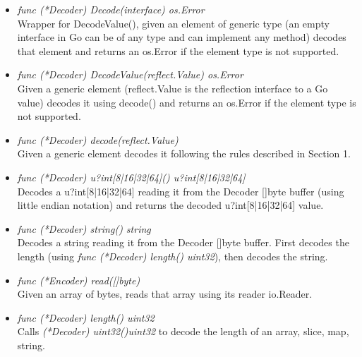 \begin{itemize}

	\item \emph{func (*Decoder) Decode(interface{}) os.Error}\\
	Wrapper for DecodeValue(), given an element of generic type (an empty interface in Go can be of any type and can implement any method) decodes that element and returns an os.Error if the element type is not supported.
	
	\item \emph{func (*Decoder) DecodeValue(reflect.Value) os.Error}\\
	Given a generic element (reflect.Value is the reflection interface to a Go value) decodes it using decode() and returns an os.Error if the element type is not supported.
	
	\item \emph{func (*Decoder) decode(reflect.Value)}\\
	Given a generic element decodes it following the rules described in Section 1.
	
	\item \emph{func (*Decoder) u?int[8|16|32|64]() u?int[8|16|32|64]}\\
	Decodes a u?int[8|16|32|64] reading it from the Decoder []byte buffer (using little endian notation) and returns the decoded u?int[8|16|32|64] value.
	
	\item \emph{func (*Decoder) string() string}\\
	Decodes a string reading it from the Decoder []byte buffer. First decodes the length (using \emph{func (*Decoder) length() uint32}), then decodes the string.
	
	\item \emph{func (*Encoder) read([]byte)}\\
	Given an array of bytes, reads that array using its reader io.Reader.
	
	\item \emph{func (*Decoder) length() uint32}\\
	Calls \emph{(*Decoder) uint32()uint32} to decode the length of an array, slice, map, string.

\end{itemize}

